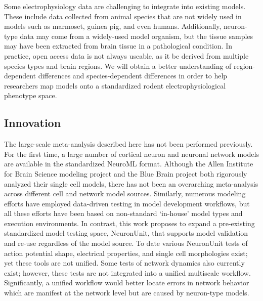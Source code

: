 Some electrophysiology data are challenging to integrate into existing models.
These include data collected from animal species that are not widely used in models such as marmoset, guinea pig, and even humans. 
Additionally, neuron-type data may come from a widely-used model organism, but the tissue samples may have been extracted from brain tissue in a pathological condition.
In practice, open access data is not always useable, as it be derived from multiple species types and brain regions. We will obtain a better understanding of region-dependent differences and species-dependent differences in order to help researchers map models onto a standardized rodent electrophysiological phenotype space.
\subsection{Innovation}
The large-scale meta-analysis described here has not been performed previously. For the first time, a large number of cortical neuron and neuronal network models are available in the standardized NeuroML format. Although the Allen Institute for Brain Science modeling project and the Blue Brain project both rigorously analyzed their single cell models, there has not been an overarching meta-analysis across different cell and network model sources. Similarly, numerous modeling efforts have employed data-driven testing in model development workflows, but all these efforts have been based on non-standard ‘in-house’ model types and execution environments. In contrast, this work proposes to expand a pre-existing standardized model testing space, NeuronUnit, that supports model validation and re-use regardless of the model source. To date various NeuronUnit tests of action potential shape, electrical properties, and single cell morphologies exist; yet these tools are not unified. Some tests of network dynamics also currently exist; however, these tests are not integrated into a unified multiscale workflow. Significantly, a unified workflow would better locate errors in network behavior which are manifest at the network level but are caused by neuron-type models. \newline
\newline

